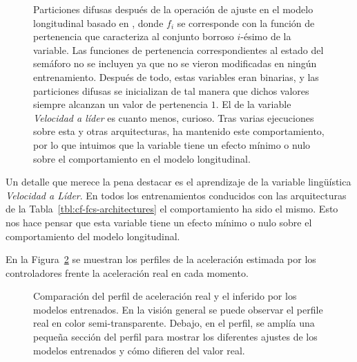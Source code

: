 \begin{figure}
	\centering
	\qquad
	\qquad
	\qquad
	\caption[Particiones difusas después de la operación de ajuste en el modelo longitudinal basado en \acrshort{fcs}]{Particiones difusas después de la operación de ajuste en el modelo longitudinal basado en , donde $f_i$ se corresponde con la función de pertenencia que caracteriza al conjunto borroso $i$-ésimo de la variable. Las funciones de pertenencia correspondientes al estado del semáforo no se incluyen ya que no se vieron modificadas en ningún entrenamiento. Después de todo, estas variables eran binarias, y las particiones difusas se inicializan de tal manera que dichos valores siempre alcanzan un valor de pertenencia $1$. El de la variable \textit{Velocidad a líder} es cuanto menos, curioso. Tras varias ejecuciones sobre esta y otras arquitecturas, ha mantenido este comportamiento, por lo que intuimos que la variable tiene un efecto mínimo o nulo sobre el comportamiento en el modelo longitudinal.}
	\label{fig:adjusted-fuzzy-partitions}
\end{figure}

Un detalle que merece la pena destacar es el aprendizaje de la variable lingüística \textit{Velocidad a Líder}. En todos los entrenamientos conducidos con las arquitecturas de la Tabla~\ref{tbl:cf-fcs-architectures} el comportamiento ha sido el mismo. Esto nos hace pensar que esta variable tiene un efecto mínimo o nulo sobre el comportamiento del modelo longitudinal.

En la Figura~\ref{fig:fcs-test-comparisons} se muestran los perfiles de la aceleración estimada por los controladores frente la aceleración real en cada momento. 

\begin{figure}
	\centering
	\qquad
	\caption[Comparación del perfil de aceleración real y el inferido por los modelos entrenados]{Comparación del perfil de aceleración real y el inferido por los modelos entrenados. En la visión general se puede observar el perfile real en color semi-transparente. Debajo, en el perfil, se amplía una pequeña sección del perfil para mostrar los diferentes ajustes de los modelos entrenados y cómo difieren del valor real.}
	\label{fig:fcs-test-comparisons}
\end{figure}

